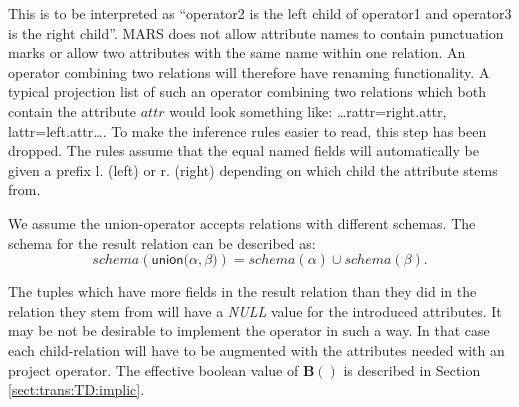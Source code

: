This is to be interpreted as ``\textsf{operator2} is the left child of \textsf{operator1} and \textsf{operator3} is
the right child''. MARS does not allow attribute names to contain punctuation marks or allow two attributes with the
same name within one relation. An operator combining two relations will therefore have renaming functionality. A
typical projection list of such an operator combining two relations which both contain the attribute $attr$ would
look something like: \textsf{\ldots rattr=right.attr, lattr=left.attr\ldots}. To make the inference rules
easier to read, this step has been dropped. The rules assume that the equal
named fields will automatically be given a prefix \textsf{l.} (left) or
\textsf{r.} (right) depending on which child the attribute stems from.

We assume the \textsf{union}-operator accepts relations with different schemas. The schema for the result
relation can be described as:
\begin{equation*}
schema(\textsf{union(}\alpha, \beta\texttt{)}) = schema(\alpha) \cup schema(\beta).
\end{equation*}

The tuples which have more fields in the result relation than they did in the relation they stem from will
have a \textit{NULL} value for the introduced attributes. It may be not be
desirable to implement the operator in such a way. In that case each
child-relation will have to be augmented with the attributes needed with an
\textsf{project} operator. The effective boolean value of \textbf{B}$()$ is
described in Section \ref{sect:trans:TD:implic}. 

